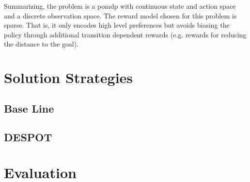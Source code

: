 Summarizing, the problem is a \ac{pomdp} with continuous state and action space
and a discrete observation space. The reward model chosen for this problem is
sparse. That is, it only encodes high level preferences but avoids biasing the
policy through additional transition dependent rewards (e.g. rewards for
reducing the distance to the goal).

\section{Solution Strategies}

\subsection{Base Line}

\subsection{DESPOT}

\section{Evaluation}\label{sec:lp-evaluation}
